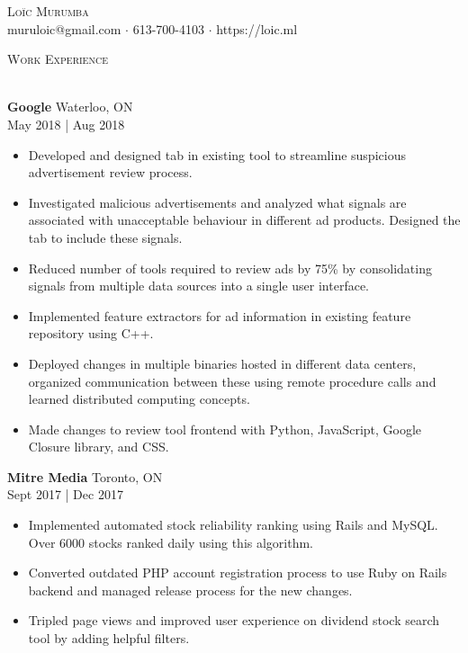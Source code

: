 \documentclass[a4paper]{article}
\newcommand{\lineunder} {
    \vspace*{-8pt} \\
    \hspace*{-18pt} \hrulefill \\
}
\newcommand{\header} [1] {
    {\hspace*{-18pt}\vspace*{6pt} \textsc{#1}}
    \vspace*{-6pt} \lineunder
}
\begin{document}
\vspace*{-40pt}

    

\vspace*{-10pt}
\begin{center}
	{\Huge \scshape {Loïc Murumba}}\\
	muruloic@gmail.com $\cdot$ 613-700-4103 $\cdot$ https://loic.ml\\
\end{center}

\header{Work Experience}
\vspace{1mm}

\textbf{Google} \hfill Waterloo, ON\\
 \hfill May 2018 | Aug 2018\\
\vspace{-1mm}
\begin{itemize} \itemsep 1pt
	\item Developed and designed tab in existing tool to streamline suspicious advertisement review process.
    \item Investigated malicious advertisements and analyzed what signals are associated with unacceptable behaviour in different ad products. Designed the tab to include these signals.
    \item Reduced number of tools required to review ads by 75\% by consolidating signals from multiple data sources into a single user interface.
	\item Implemented feature extractors for ad information in existing feature repository using C++.
	\item Deployed changes in multiple binaries hosted in different data centers, organized communication between these using remote procedure calls and learned distributed computing concepts.
	\item Made changes to review tool frontend with Python, JavaScript, Google Closure library, and CSS.

\end{itemize}

\textbf{Mitre Media} \hfill Toronto, ON\\
 \hfill Sept 2017 | Dec 2017\\
\vspace{-1mm}
\begin{itemize} \itemsep 1pt
	\item Implemented automated stock reliability ranking using Rails and MySQL. Over 6000 stocks ranked daily using this algorithm.
	\item Converted outdated PHP account registration process to use Ruby on Rails backend and managed release process for the new changes.
	\item Tripled page views and improved user experience on dividend stock search tool by adding helpful filters.
\end{itemize}
\end{document}
